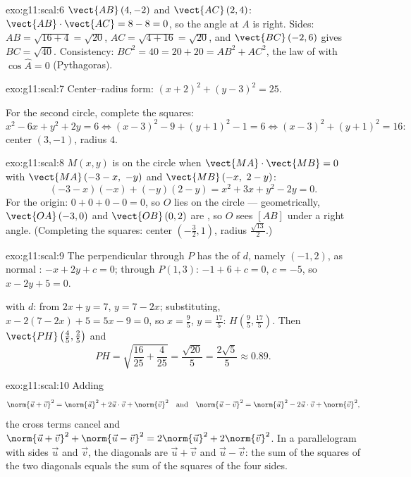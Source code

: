 \begin{solution}{exo:g11:scal:6}
$\vect{AB}\,(4, -2)$ and $\vect{AC}\,(2, 4)$:
$\vect{AB}\cdot\vect{AC} = 8 - 8 = 0$, so the angle at $A$ is right.
Sides: $AB = \sqrt{16 + 4} = \sqrt{20}$, $AC = \sqrt{4 + 16} =
\sqrt{20}$, and $\vect{BC}\,(-2, 6)$ gives $BC = \sqrt{40}$. Consistency:
$BC^2 = 40 = 20 + 20 = AB^2 + AC^2$, the law of  with
$\cos\widehat A = 0$ (Pythagoras).
\end{solution}

\begin{solution}{exo:g11:scal:7}
Center--radius form: $(x + 2)^2 + (y - 3)^2 = 25$.

For the second circle, complete the squares:
\[
x^2 - 6x + y^2 + 2y = 6
\iff (x - 3)^2 - 9 + (y + 1)^2 - 1 = 6
\iff (x-3)^2 + (y+1)^2 = 16 :
\]
center $(3, -1)$, radius $4$.
\end{solution}

\begin{solution}{exo:g11:scal:8}
$M(x,y)$ is on the circle when $\vect{MA}\cdot\vect{MB} = 0$ with
$\vect{MA}\,(-3 - x,\ -y)$ and $\vect{MB}\,(-x,\ 2 - y)$:
\[
(-3 - x)(-x) + (-y)(2 - y) = x^2 + 3x + y^2 - 2y = 0 .
\]
For the origin: $0 + 0 + 0 - 0 = 0$, so $O$ lies on the circle ---
geometrically, $\vect{OA}\,(-3,0)$ and $\vect{OB}\,(0,2)$ are ,
so $O$ sees $[AB]$ under a right angle. (Completing the squares:
center $\left(-\frac32, 1\right)$, radius $\frac{\sqrt{13}}{2}$.)
\end{solution}

\begin{solution}{exo:g11:scal:9}
The perpendicular through $P$ has the  of $d$, namely
$(-1, 2)$, as normal :  $-x + 2y + c = 0$; through
$P(1,3)$: $-1 + 6 + c = 0$, $c = -5$, so $x - 2y + 5 = 0$.

 with $d$: from $2x + y = 7$, $y = 7 - 2x$; substituting,
$x - 2(7 - 2x) + 5 = 5x - 9 = 0$, so $x = \frac95$, $y = \frac{17}5$:
$H\left(\frac95, \frac{17}5\right)$. Then
$\vect{PH}\left(\frac45, \frac25\right)$ and
\[
PH = \sqrt{\frac{16}{25} + \frac{4}{25}} = \frac{\sqrt{20}}{5}
= \frac{2\sqrt5}{5} \approx 0.89 .
\]
\end{solution}

\begin{solution}{exo:g11:scal:10}
Adding
\[
\norm{\vec u + \vec v}^2 = \norm{\vec u}^2 + 2\vec u\cdot\vec v +
\norm{\vec v}^2
\quad\text{and}\quad
\norm{\vec u - \vec v}^2 = \norm{\vec u}^2 - 2\vec u\cdot\vec v +
\norm{\vec v}^2,
\]
the cross terms cancel and
$\norm{\vec u + \vec v}^2 + \norm{\vec u - \vec v}^2 = 2\norm{\vec u}^2 +
2\norm{\vec v}^2$. In a parallelogram with sides $\vec u$ and $\vec v$,
the diagonals are $\vec u + \vec v$ and $\vec u - \vec v$: the sum of the
squares of the two diagonals equals the sum of the squares of the four
sides.
\end{solution}

